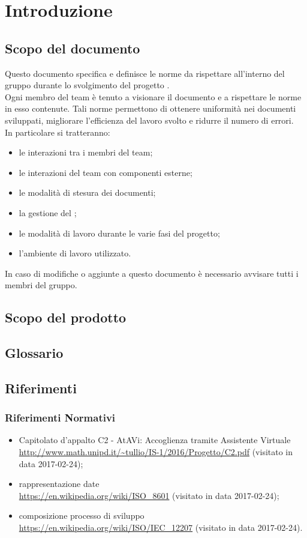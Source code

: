 \section{Introduzione}
	\subsection{Scopo del documento}
	Questo documento specifica e definisce le norme da rispettare all'interno del gruppo \GRUPPO{} durante lo svolgimento del progetto \PROGETTO. \\
	Ogni membro del team è tenuto a visionare il documento e a rispettare le norme in esso contenute. Tali norme permettono di ottenere uniformità nei documenti sviluppati,
	migliorare l'efficienza del lavoro svolto e ridurre il numero di errori. \\
	In particolare si tratteranno:
	\begin{itemize}
		\item le interazioni tra i membri del team;
		\item le interazioni del team con componenti esterne;
		\item le modalità di stesura dei documenti;
		\item la gestione del ;
		\item le modalità di lavoro durante le varie fasi del progetto;
		\item l'ambiente di lavoro utilizzato.
	\end{itemize}
	In caso di modifiche o aggiunte a questo documento è necessario avvisare tutti i membri del gruppo.
	\subsection{Scopo del prodotto}
		\SCOPO
	\subsection{Glossario}
		\GLOSSARIO
	\subsection{Riferimenti}
		\subsubsection{Riferimenti Normativi}
		\begin{itemize}
		\item Capitolato d'appalto C2 - AtAVi: Accoglienza tramite Assistente Virtuale \\
		\url{http://www.math.unipd.it/~tullio/IS-1/2016/Progetto/C2.pdf} (visitato in data 2017-02-24);
		\item rappresentazione date \\
		\url{https://en.wikipedia.org/wiki/ISO_8601} (visitato in data 2017-02-24);
		\item composizione processo di sviluppo \\
		\url{https://en.wikipedia.org/wiki/ISO/IEC_12207} (visitato in data 2017-02-24).
\newpage
	\end{itemize}

